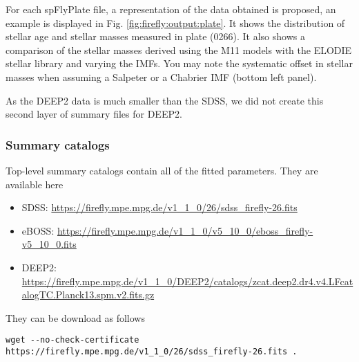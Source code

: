 \documentclass[onecolumn]{aa}
\begin{document}
For each spFlyPlate file, a representation of the data obtained is proposed, an example is displayed in 
Fig. \ref{fig:firefly:output:plate}. 
It shows the distribution of stellar age and stellar masses measured in plate (0266). It also shows a comparison of the stellar masses derived using the M11 models with the ELODIE stellar library and varying the IMFs. You may note the systematic offset in stellar masses when assuming a Salpeter or a Chabrier IMF (bottom left panel). 

As the DEEP2 data is much smaller than the SDSS, we did not create this second layer of summary files for DEEP2. 
% 

\subsubsection{Summary catalogs}
Top-level summary catalogs contain all of the fitted parameters. They are available here 
\begin{itemize}
\item SDSS: \url{https://firefly.mpe.mpg.de/v1_1_0/26/sdss_firefly-26.fits}
\item eBOSS: \url{https://firefly.mpe.mpg.de/v1_1_0/v5_10_0/eboss_firefly-v5_10_0.fits}
\item DEEP2: \url{https://firefly.mpe.mpg.de/v1_1_0/DEEP2/catalogs/zcat.deep2.dr4.v4.LFcatalogTC.Planck13.spm.v2.fits.gz}
\end{itemize}
They can be download as follows
\begin{verbatim}
wget --no-check-certificate https://firefly.mpe.mpg.de/v1_1_0/26/sdss_firefly-26.fits .
\end{verbatim}
\end{document}
